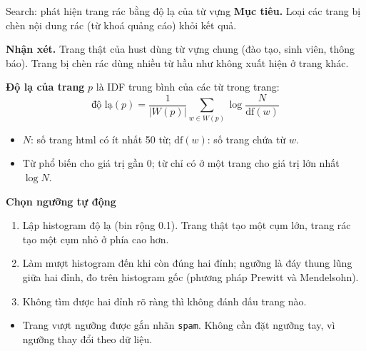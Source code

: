 \documentclass[aspectratio=169,t,10pt]{beamer}
\newcommand{\code}[1]{\texttt{#1}}
\newcommand{\muctieu}[1]{\noindent\textbf{Mục tiêu.} #1\par\vspace{4pt}}
\begin{document}
\begin{frame}[shrink]{Search: phát hiện trang rác bằng độ lạ của từ vựng}
\small
\muctieu{Loại các trang bị chèn nội dung rác (từ khoá quảng cáo) khỏi kết quả.}
\textbf{Nhận xét.} Trang thật của hust dùng từ vựng chung (đào tạo, sinh viên, thông báo). Trang bị chèn rác dùng nhiều từ hầu như không xuất hiện ở trang khác.\par
\vspace{4pt}
\textbf{Độ lạ của trang} $p$ là IDF trung bình của các từ trong trang:
$$\text{độ lạ}(p)=\frac{1}{|W(p)|}\sum_{w\in W(p)}\log\frac{N}{\mathrm{df}(w)}$$
\begin{itemize}
  \item $N$: số trang html có ít nhất 50 từ; $\mathrm{df}(w)$: số trang chứa từ $w$.
  \item Từ phổ biến cho giá trị gần 0; từ chỉ có ở một trang cho giá trị lớn nhất $\log N$.
\end{itemize}
\textbf{Chọn ngưỡng tự động}
\begin{enumerate}
  \item Lập histogram độ lạ (bin rộng 0.1). Trang thật tạo một cụm lớn, trang rác tạo một cụm nhỏ ở phía cao hơn.
  \item Làm mượt histogram đến khi còn đúng hai đỉnh; ngưỡng là đáy thung lũng giữa hai đỉnh, đo trên histogram gốc (phương pháp Prewitt và Mendelsohn).
  \item Không tìm được hai đỉnh rõ ràng thì không đánh dấu trang nào.
\end{enumerate}
\begin{itemize}
  \item Trang vượt ngưỡng được gắn nhãn \code{spam}. Không cần đặt ngưỡng tay, vì ngưỡng thay đổi theo dữ liệu.
\end{itemize}
\end{frame}
\end{document}
